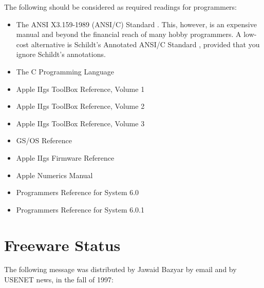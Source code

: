 \documentclass{report}
\begin{document}
The following should be considered as required readings for programmers:
\begin{itemize}
\item The ANSI X3.159-1989 (ANSI/C) Standard \cite{ansic}.  This, however,
	is an expensive manual and beyond the financial reach of many
	hobby programmers.  A low-cost alternative is Schildt's
	Annotated ANSI/C Standard \cite{schildt}, provided that you 
	ignore Schildt's annotations.
\item The C Programming Language \cite{kern_ritchie}
\item Apple IIgs ToolBox Reference, Volume 1 \cite{tbr1}
\item Apple IIgs ToolBox Reference, Volume 2 \cite{tbr2}
\item Apple IIgs ToolBox Reference, Volume 3 \cite{tbr3}
\item GS/OS Reference \cite{gsos}
\item Apple IIgs Firmware Reference \cite{gsfirm}
\item Apple Numerics Manual \cite{numerics}
\item Programmers Reference for System 6.0 \cite{pr600}
\item Programmers Reference for System 6.0.1 \cite{pr601}
\end{itemize}

\section{Freeware Status}

The following message was distributed by Jawaid Bazyar by email and
by USENET news, in the fall of 1997:
\end{document}
